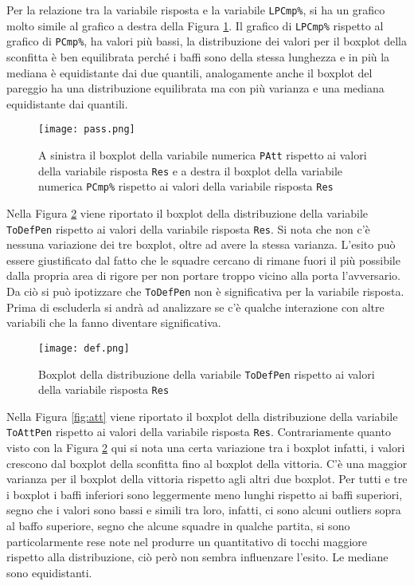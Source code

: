 Per la relazione tra la variabile risposta e la variabile \texttt{LPCmp\%}, si ha un grafico molto simile al grafico a destra della Figura \ref{fig:pass}. Il grafico di \texttt{LPCmp\%} rispetto al grafico di \texttt{PCmp\%}, ha valori più bassi, la distribuzione dei valori per il boxplot della sconfitta è ben equilibrata perché i baffi sono della stessa lunghezza e in più la mediana è equidistante dai due quantili, analogamente anche il boxplot del pareggio ha una distribuzione equilibrata ma con più varianza e una mediana equidistante dai quantili.\\

\begin{figure}[htbp]
	\begin{center}
		\texttt{[image: pass.png]}
		\caption{A sinistra il boxplot della variabile numerica \texttt{PAtt} rispetto ai valori della variabile risposta \texttt{Res} e a destra il boxplot della variabile numerica \texttt{PCmp\%} rispetto ai valori della variabile risposta \texttt{Res}} \label{fig:pass}
	\end{center}
\end{figure}

Nella Figura \ref{fig:defp} viene riportato il boxplot della distribuzione della variabile \texttt{ToDefPen} rispetto ai valori della variabile risposta \texttt{Res}. Si nota che non c'è nessuna variazione dei tre boxplot, oltre ad avere la stessa varianza. L'esito può essere giustificato dal fatto che le squadre cercano di rimane fuori il più possibile dalla propria area di rigore per non portare troppo vicino alla porta l'avversario. Da ciò si può ipotizzare che \texttt{ToDefPen} non è significativa per la variabile risposta. Prima di escluderla si andrà ad analizzare se c'è qualche interazione con altre variabili che la fanno diventare significativa.\\

\begin{figure}[htbp]
	\begin{center}
		\texttt{[image: def.png]}
		\caption{Boxplot della distribuzione della variabile \texttt{ToDefPen} rispetto ai valori della variabile risposta \texttt{Res} } \label{fig:defp}
	\end{center}
\end{figure}

Nella Figura \ref{fig:att} viene riportato il boxplot della distribuzione della variabile \texttt{ToAttPen} rispetto ai valori della variabile risposta \texttt{Res}. Contrariamente quanto visto con la Figura \ref{fig:defp} qui si nota una certa variazione tra i boxplot infatti, i valori crescono dal boxplot della sconfitta fino al boxplot della vittoria. C'è una maggior varianza per il boxplot della vittoria rispetto agli altri due boxplot. Per tutti e tre i boxplot i baffi inferiori sono leggermente meno lunghi rispetto ai baffi superiori, segno che i valori sono bassi e simili tra loro, infatti, ci sono alcuni outliers sopra al baffo superiore, segno che alcune squadre in qualche partita, si sono particolarmente rese note nel produrre un quantitativo di tocchi maggiore rispetto alla distribuzione, ciò però non sembra influenzare l'esito. Le mediane sono equidistanti.\\

